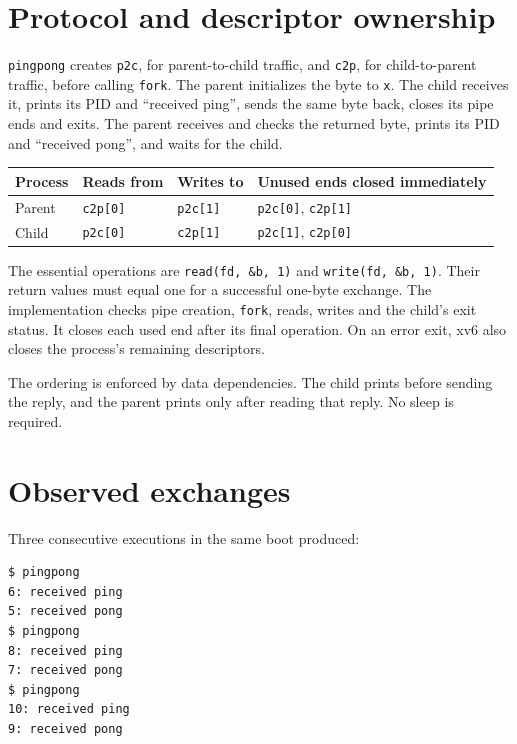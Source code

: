 \documentclass{../latex/utmreport}
\begin{document}
\section{Protocol and descriptor
ownership}\label{protocol-and-descriptor-ownership}

\texttt{pingpong} creates \texttt{p2c}, for parent-to-child traffic, and
\texttt{c2p}, for child-to-parent traffic, before calling \texttt{fork}.
The parent initializes the byte to \texttt{x}. The child receives it,
prints its PID and ``received ping'', sends the same byte back, closes
its pipe ends and exits. The parent receives and checks the returned
byte, prints its PID and ``received pong'', and waits for the child.

{
\begin{longtable}[]{@{}llll@{}}
\hline
Process & Reads from & Writes to & Unused ends closed immediately \\
\hline
\endhead
\hline
\endlastfoot
Parent & \texttt{c2p{[}0{]}} & \texttt{p2c{[}1{]}} &
\texttt{p2c{[}0{]}}, \texttt{c2p{[}1{]}} \\
Child & \texttt{p2c{[}0{]}} & \texttt{c2p{[}1{]}} & \texttt{p2c{[}1{]}},
\texttt{c2p{[}0{]}} \\
\end{longtable}
}

The essential operations are \texttt{read(fd,\ \&b,\ 1)} and
\texttt{write(fd,\ \&b,\ 1)}. Their return values must equal one for a
successful one-byte exchange. The implementation checks pipe creation,
\texttt{fork}, reads, writes and the child's exit status. It closes each
used end after its final operation. On an error exit, xv6 also closes
the process's remaining descriptors.

The ordering is enforced by data dependencies. The child prints before
sending the reply, and the parent prints only after reading that reply.
No sleep is required.

\section{Observed exchanges}\label{observed-exchanges}

Three consecutive executions in the same boot produced:

\begin{lstlisting}
$ pingpong
6: received ping
5: received pong
$ pingpong
8: received ping
7: received pong
$ pingpong
10: received ping
9: received pong
\end{lstlisting}
\end{document}
